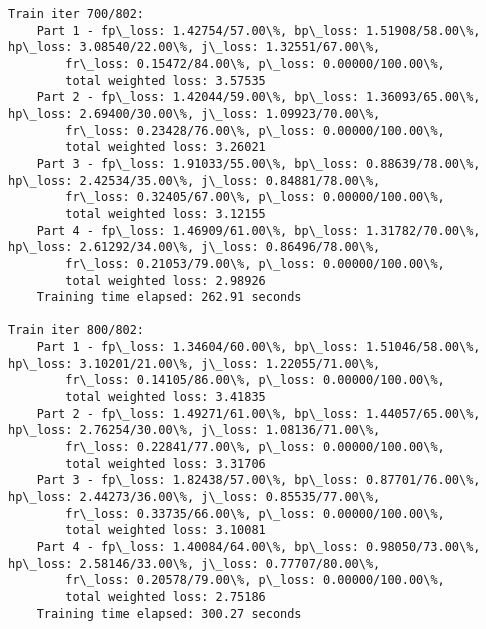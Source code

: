 \documentclass[11pt]{article}
\begin{document}
\begin{Verbatim}[commandchars=\\\{\}]
Train iter 700/802:
	Part 1 - fp\_loss: 1.42754/57.00\%, bp\_loss: 1.51908/58.00\%, hp\_loss: 3.08540/22.00\%, j\_loss: 1.32551/67.00\%, 
		fr\_loss: 0.15472/84.00\%, p\_loss: 0.00000/100.00\%, 
		total weighted loss: 3.57535
	Part 2 - fp\_loss: 1.42044/59.00\%, bp\_loss: 1.36093/65.00\%, hp\_loss: 2.69400/30.00\%, j\_loss: 1.09923/70.00\%, 
		fr\_loss: 0.23428/76.00\%, p\_loss: 0.00000/100.00\%, 
		total weighted loss: 3.26021
	Part 3 - fp\_loss: 1.91033/55.00\%, bp\_loss: 0.88639/78.00\%, hp\_loss: 2.42534/35.00\%, j\_loss: 0.84881/78.00\%, 
		fr\_loss: 0.32405/67.00\%, p\_loss: 0.00000/100.00\%, 
		total weighted loss: 3.12155
	Part 4 - fp\_loss: 1.46909/61.00\%, bp\_loss: 1.31782/70.00\%, hp\_loss: 2.61292/34.00\%, j\_loss: 0.86496/78.00\%, 
		fr\_loss: 0.21053/79.00\%, p\_loss: 0.00000/100.00\%, 
		total weighted loss: 2.98926
	Training time elapsed: 262.91 seconds

Train iter 800/802:
	Part 1 - fp\_loss: 1.34604/60.00\%, bp\_loss: 1.51046/58.00\%, hp\_loss: 3.10201/21.00\%, j\_loss: 1.22055/71.00\%, 
		fr\_loss: 0.14105/86.00\%, p\_loss: 0.00000/100.00\%, 
		total weighted loss: 3.41835
	Part 2 - fp\_loss: 1.49271/61.00\%, bp\_loss: 1.44057/65.00\%, hp\_loss: 2.76254/30.00\%, j\_loss: 1.08136/71.00\%, 
		fr\_loss: 0.22841/77.00\%, p\_loss: 0.00000/100.00\%, 
		total weighted loss: 3.31706
	Part 3 - fp\_loss: 1.82438/57.00\%, bp\_loss: 0.87701/76.00\%, hp\_loss: 2.44273/36.00\%, j\_loss: 0.85535/77.00\%, 
		fr\_loss: 0.33735/66.00\%, p\_loss: 0.00000/100.00\%, 
		total weighted loss: 3.10081
	Part 4 - fp\_loss: 1.40084/64.00\%, bp\_loss: 0.98050/73.00\%, hp\_loss: 2.58146/33.00\%, j\_loss: 0.77707/80.00\%, 
		fr\_loss: 0.20578/79.00\%, p\_loss: 0.00000/100.00\%, 
		total weighted loss: 2.75186
	Training time elapsed: 300.27 seconds


\end{Verbatim}
\end{document}
